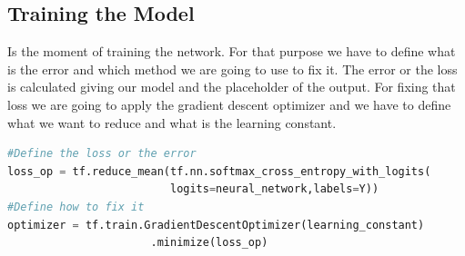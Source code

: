 \subsection{Training the Model}
Is the moment of training the network. For that purpose we have to define what is the error and which method we are going to use to fix it. The error or the loss is calculated giving our model and the placeholder of the output. For fixing that loss we are going to apply the gradient descent optimizer and we have to define what we want to reduce and what is the learning constant.
\begin{lstlisting}[language=python]
#Define the loss or the error
loss_op = tf.reduce_mean(tf.nn.softmax_cross_entropy_with_logits(
                         logits=neural_network,labels=Y))
#Define how to fix it
optimizer = tf.train.GradientDescentOptimizer(learning_constant)
                      .minimize(loss_op)
\end{lstlisting}

